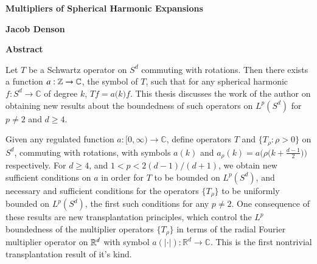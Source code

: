 
\fancyhf{} %
\fancyhead[RO,R]{\thepage} %
\renewcommand{\headrulewidth}{0pt}

\begin{center}
    \Large
    \textbf{Multipliers of Spherical Harmonic Expansions}
    
    \vspace{0.4cm}
    \textbf{Jacob Denson}
    
    \vspace{0.9cm}
    \textbf{Abstract}
\end{center}

Let $T$ be a Schwartz operator on $S^d$ commuting with rotations. Then there exists a function $a: \operatorname{\mathbb{Z}} \to \operatorname{\mathbb{C}}$, the symbol of $T$, such that for any spherical harmonic $f: S^d \to \mathbb{C}$ of degree $k$, $Tf = a \big( k \big) f$. This thesis discusses the work of the author on obtaining new results about the boundedness of such operators on $L^p(S^d)$ for $p \neq 2$ and $d \geq 4$.

Given any regulated function $a: [0,\infty) \to \mathbb{C}$, define operators $T$ and $\{ T_\rho : \rho > 0 \}$ on $S^d$, commuting with rotations, with symbols $a(k)$ and $a_\rho(k) = a \big( \rho \big( k + \tfrac{d-1}{2} \big) \big)$ respectively. For $d \geq 4$, and $1 < p < 2(d-1)/(d+1)$, we obtain new sufficient conditions on $a$ in order for $T$ to be bounded on $L^p(S^d)$, and necessary and sufficient conditions for the operators $\{ T_\rho \}$ to be uniformly bounded on $L^p(S^d)$, the first such conditions for any $p \neq 2$. One consequence of these results are new transplantation principles, which control the $L^p$ boundedness of the multiplier operators $\{ T_\rho \}$ in terms of the radial Fourier multiplier operator on $\operatorname{\mathbb{R}}^d$ with symbol $a(|\cdot|): \mathbb{R}^d \to \mathbb{C}$. This is the first nontrivial transplantation result of it's kind.


%


